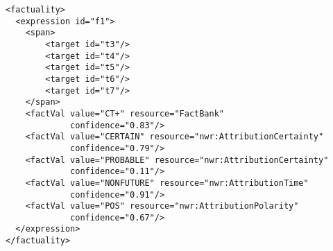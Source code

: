 \begin{Verbatim}[fontsize=\small]
<factuality>
  <expression id="f1">
    <span>
        <target id="t3"/>
        <target id="t4"/>
        <target id="t5"/>
        <target id="t6"/>
        <target id="t7"/>
    </span>
    <factVal value="CT+" resource="FactBank" 
             confidence="0.83"/>
    <factVal value="CERTAIN" resource="nwr:AttributionCertainty" 
             confidence="0.79"/>
    <factVal value="PROBABLE" resource="nwr:AttributionCertainty"
             confidence="0.11"/>
    <factVal value="NONFUTURE" resource="nwr:AttributionTime"
             confidence="0.91"/>
    <factVal value="POS" resource="nwr:AttributionPolarity"
             confidence="0.67"/>
  </expression>
</factuality>
\end{Verbatim}


